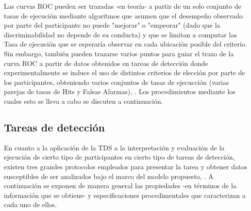 Las curvas ROC pueden ser trazadas -en teoría- a partir de un solo conjunto de tasas de ejecución \parencite{Pollack1964a, Pollack1964b, McNicol2} mediante algoritmos que asumen que el desempeño observado por parte del participante no puede "mejorar" o "empeorar" (dado que la discriminabilidad no depende de su conducta) y que se limitan a computar las Tasa de ejecución que se esperaría observar en cada ubicación posible del criterio. Sin embargo, también pueden trazarse varios puntos para guiar el trazo de la curva ROC a partir de datos obtenidos en tareas de detección donde experimentalmente se induce el uso de distintos criterios de elección por parte de los participantes, obteniendo varios conjuntos de tasas de ejecucción (varias parejas de tasas de Hits y Falsas Alarmas), \parencite{Egan1959, Swets1961, Swets1986}. Los procedimientos mediante los cuales esto se lleva a cabo se discuten a continuación.\\


\subsection{Tareas de detección}

En cuanto a la aplicación de la TDS a la interpretación y evaluación de la ejecución de cierto tipo de participantes en cierto tipo de tareas de detección, existen tres grandes protocolos empleados para presentar la tarea y obtener datos susceptibles de ser analizados bajo el marco del modelo propuesto, \parencite{McNicol2, Stainslaw1999}. A continuación se exponen de manera general las propiedades -en términos de la información que se obtiene- y especificaciones procedimentales que caracterizan a cada uno de ellos.\\

